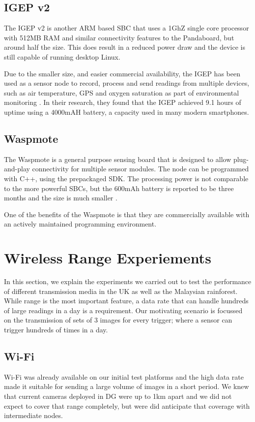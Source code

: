 \subsection{IGEP v2}

The IGEP v2 is another ARM based SBC that uses a 1GhZ single core processor with 512MB RAM and similar connectivity features to the Pandaboard, but around half the size. This does result in a reduced power draw and the device is still capable of running desktop Linux.

Due to the smaller size, and easier commercial availability, the IGEP has been used as a sensor node to record, process and send readings from multiple devices, such as air temperature, GPS and oxygen saturation as part of environmental monitoring \cite{Resch}. In their research, they found that the IGEP achieved 9.1 hours of uptime using a 4000mAH battery, a capacity used in many modern smartphones.

\subsection{Waspmote}
The Waspmote is a general purpose sensing board that is designed to allow plug-and-play connectivity for multiple sensor modules. The node can be programmed with C++, using the prepackaged SDK. The processing power is not comparable to the more powerful SBCs, but the 600mAh battery is reported to be three months and the size is much smaller \cite{Lib}.

One of the benefits of the Waspmote is that they are commercially available with an actively maintained programming environment.

\section{Wireless Range Experiements}
	In this section, we explain the experiments we carried out to test the performance of different transmission media in the UK as well as the Malaysian rainforest. While range is the most important feature, a data rate that can handle hundreds of large readings in a day is a requirement. Our motivating scenario is focussed on the transmission of sets of 3 images for every trigger; where a sensor can trigger hundreds of times in a day.

\subsection{Wi-Fi}\label{tech:wifirange}
Wi-Fi was already available on our initial test platforms and the high data rate made it suitable for sending a large volume of images in a short period. We knew that current cameras deployed in DG were up to 1km apart and we did not expect to cover that range completely, but were did anticipate that coverage with intermediate nodes.


